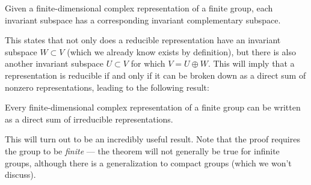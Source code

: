 \begin{theorem}
Given a finite-dimensional complex representation of a finite group, each invariant subspace has a corresponding invariant complementary subspace. 
\end{theorem}

This states that not only does a reducible representation have an invariant subspace $W \subset V$ (which we already know exists by definition), but there is also another invariant subspace $U \subset V$ for which $V = U \oplus W$. This will imply that a representation is reducible if and only if it can be broken down as a direct sum of nonzero representations, leading to the following result:

\begin{theorem}
Every finite-dimensional complex representation of a finite group can be written as a direct sum of irreducible representations. 
\end{theorem}

This will turn out to be an incredibly useful result. Note that the proof requires the group to be \emph{finite} --- the theorem will not generally be true for infinite groups, although there is a generalization to compact groups (which we won't discuss). 




